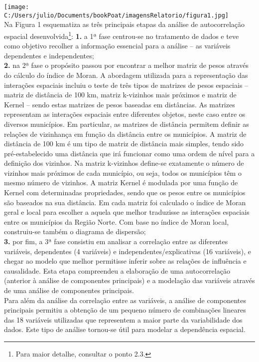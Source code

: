 \documentclass[
]{book}
\begin{document}
\texttt{[image: C:/Users/julio/Documents/bookPoat/imagensRelatorio/figura1.jpg]}\\
Na Figura 1 esquematiza as três principais etapas da análise de autocorrelação espacial desenvolvida\footnote{Para maior detalhe, consultar o ponto 2.3.}:
\textbf{1.} a 1ª fase centrou-se no tratamento de dados e teve como objetivo recolher a informação essencial para a análise -- as variáveis dependentes e independentes;\\
\textbf{2.} na 2ª fase o propósito passou por encontrar a melhor matriz de pesos através do cálculo do índice de Moran. A abordagem utilizada para a representação das interações espaciais incluiu o teste de três tipos de matrizes de pesos espaciais -- matriz de distância de 100 km, matriz k-vizinhos mais próximos e matriz de Kernel -- sendo estas matrizes de pesos baseadas em distâncias. As matrizes representam as interações espaciais entre diferentes objetos, neste caso entre os diversos municípios. Em particular, as matrizes de distância permitem definir as relações de vizinhança em função da distância entre os municípios. A matriz de distância de 100 km é um tipo de matriz de distância mais simples, tendo sido pré-estabelecido uma distância que irá funcionar como uma ordem de nível para a definição dos vizinhos. Na matriz k-vizinhos define-se exatamente o número de vizinhos mais próximos de cada município, ou seja, todos os municípios têm o mesmo número de vizinhos. A matriz Kernel é modulada por uma função de Kernel com determinadas propriedades, sendo que os pesos entre os municípios são baseados na sua distância. Em cada matriz foi calculado o índice de Moran geral e local para escolher a aquela que melhor traduzisse as interações espaciais entre os municípios da Região Norte. Com base no índice de Moran local, construiu-se também o diagrama de dispersão;\\
\textbf{3.} por fim, a 3ª fase consistiu em analisar a correlação entre as diferentes variáveis, dependentes (4 variáveis) e independentes/explicativas (16 variáveis), e chegar ao modelo que melhor permitisse inferir sobre as relações de influência e causalidade. Esta etapa compreendeu a elaboração de uma autocorrelação (anterior à análise de componentes principais) e a modelação das variáveis através de uma análise de componentes principais.\\
Para além da análise da correlação entre as variáveis, a análise de componentes principais permitiu a obtenção de um pequeno número de combinações lineares das 18 variáveis utilizadas que representem a maior parte da variabilidade dos dados. Este tipo de análise tornou-se útil para modelar a dependência espacial.\\
\end{document}
